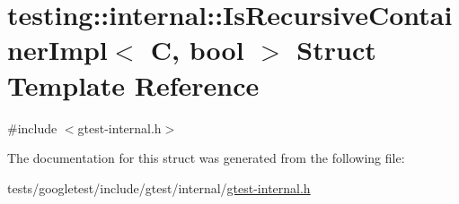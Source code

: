 \hypertarget{structtesting_1_1internal_1_1IsRecursiveContainerImpl}{}\section{testing\+:\+:internal\+:\+:Is\+Recursive\+Container\+Impl$<$ C, bool $>$ Struct Template Reference}
\label{structtesting_1_1internal_1_1IsRecursiveContainerImpl}


{\ttfamily \#include $<$gtest-\/internal.\+h$>$}



The documentation for this struct was generated from the following file\+:\begin{DoxyCompactItemize}
\item 
tests/googletest/include/gtest/internal/\hyperlink{gtest-internal_8h}{gtest-\/internal.\+h}\end{DoxyCompactItemize}
